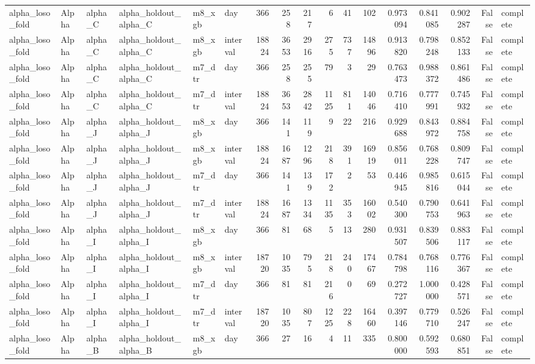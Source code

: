 \begin{tabular}{llllllrrrrrrrrrrl}
alpha_loso_fold & Alpha & alpha_C & alpha_holdout_alpha_C & m8_xgb & day & 366 & 258 & 217 & 6 & 41 & 102 & 0.973094 & 0.841085 & 0.902287 & False & complete \\
alpha_loso_fold & Alpha & alpha_C & alpha_holdout_alpha_C & m8_xgb & interval & 18824 & 3653 & 2916 & 275 & 737 & 14896 & 0.913820 & 0.798248 & 0.852133 & False & complete \\
alpha_loso_fold & Alpha & alpha_C & alpha_holdout_alpha_C & m7_dtr & day & 366 & 258 & 255 & 79 & 3 & 29 & 0.763473 & 0.988372 & 0.861486 & False & complete \\
alpha_loso_fold & Alpha & alpha_C & alpha_holdout_alpha_C & m7_dtr & interval & 18824 & 3653 & 2842 & 1125 & 811 & 14046 & 0.716410 & 0.777991 & 0.745932 & False & complete \\
alpha_loso_fold & Alpha & alpha_J & alpha_holdout_alpha_J & m8_xgb & day & 366 & 141 & 119 & 9 & 22 & 216 & 0.929688 & 0.843972 & 0.884758 & False & complete \\
alpha_loso_fold & Alpha & alpha_J & alpha_holdout_alpha_J & m8_xgb & interval & 18824 & 1687 & 1296 & 218 & 391 & 16919 & 0.856011 & 0.768228 & 0.809747 & False & complete \\
alpha_loso_fold & Alpha & alpha_J & alpha_holdout_alpha_J & m7_dtr & day & 366 & 141 & 139 & 172 & 2 & 53 & 0.446945 & 0.985816 & 0.615044 & False & complete \\
alpha_loso_fold & Alpha & alpha_J & alpha_holdout_alpha_J & m7_dtr & interval & 18824 & 1687 & 1334 & 1135 & 353 & 16002 & 0.540300 & 0.790753 & 0.641963 & False & complete \\
alpha_loso_fold & Alpha & alpha_I & alpha_holdout_alpha_I & m8_xgb & day & 366 & 81 & 68 & 5 & 13 & 280 & 0.931507 & 0.839506 & 0.883117 & False & complete \\
alpha_loso_fold & Alpha & alpha_I & alpha_holdout_alpha_I & m8_xgb & interval & 18720 & 1035 & 795 & 218 & 240 & 17467 & 0.784798 & 0.768116 & 0.776367 & False & complete \\
alpha_loso_fold & Alpha & alpha_I & alpha_holdout_alpha_I & m7_dtr & day & 366 & 81 & 81 & 216 & 0 & 69 & 0.272727 & 1.000000 & 0.428571 & False & complete \\
alpha_loso_fold & Alpha & alpha_I & alpha_holdout_alpha_I & m7_dtr & interval & 18720 & 1035 & 807 & 1225 & 228 & 16460 & 0.397146 & 0.779710 & 0.526247 & False & complete \\
alpha_loso_fold & Alpha & alpha_B & alpha_holdout_alpha_B & m8_xgb & day & 366 & 27 & 16 & 4 & 11 & 335 & 0.800000 & 0.592593 & 0.680851 & False & complete \\

\end{tabular}

